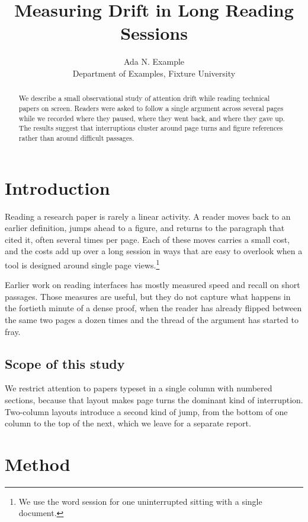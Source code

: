 \documentclass[11pt]{article}
\title{Measuring Drift in Long Reading Sessions}
\author{Ada N. Example\\ Department of Examples, Fixture University}
\date{}
\begin{document}
\maketitle

\begin{abstract}
We describe a small observational study of attention drift while reading
technical papers on screen. Readers were asked to follow a single argument
across several pages while we recorded where they paused, where they went back,
and where they gave up. The results suggest that interruptions cluster around
page turns and figure references rather than around difficult passages.
\end{abstract}

\section{Introduction}

Reading a research paper is rarely a linear activity. A reader moves back to
an earlier definition, jumps ahead to a figure, and returns to the paragraph
that cited it, often several times per page. Each of these moves carries a
small cost, and the costs add up over a long session in ways that are easy to
overlook when a tool is designed around single page views.\footnote{We use the
word session for one uninterrupted sitting with a single document.}

Earlier work on reading interfaces has mostly measured speed and recall on
short passages. Those measures are useful, but they do not capture what happens
in the fortieth minute of a dense proof, when the reader has already flipped
between the same two pages a dozen times and the thread of the argument has
started to fray.

\subsection{Scope of this study}

We restrict attention to papers typeset in a single column with numbered
sections, because that layout makes page turns the dominant kind of
interruption. Two-column layouts introduce a second kind of jump, from the
bottom of one column to the top of the next, which we leave for a separate
report.

\clearpage

\section{Method}
\end{document}
